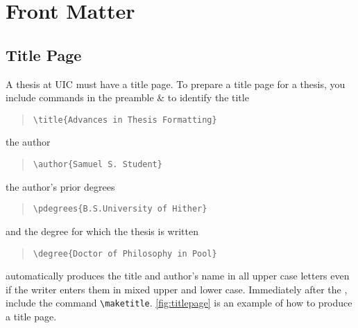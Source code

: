 \section{Front Matter}
\subsection{Title Page}\label{sec:title}
A thesis at UIC must have a title page.
To prepare a title page for a \uicthesi{} thesis, you include
commands {\underl in the preamble & } to identify the title
\begin{quote}\verb+\title{Advances in Thesis Formatting}+\end{quote}
the author
\begin{quote}\verb+\author{Samuel S. Student}+\end{quote}
the author's prior degrees
\begin{quote}\verb+\pdegrees{B.S.University of Hither}+\end{quote}
and the degree for which the thesis is written
\begin{quote}\verb+\degree{Doctor of Philosophy in Pool}+\end{quote}
\uicthesi{} automatically produces the title and author's name
in all upper case letters
even if the writer enters them in mixed upper and lower case.
Immediately after the \verb++, include the command
\verb+\maketitle+.
\ref{fig:titlepage} is an example of how to produce a title page.
